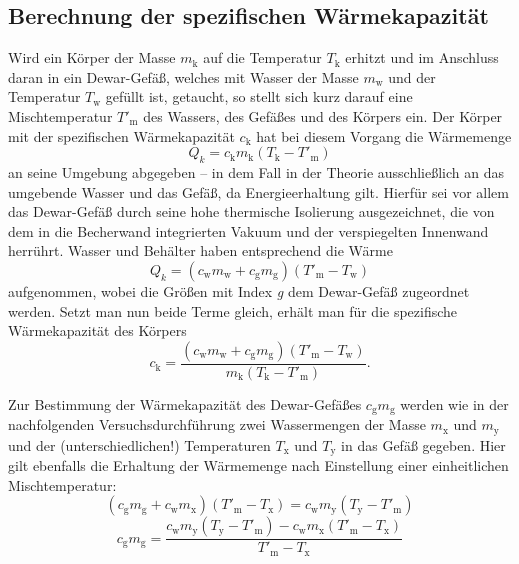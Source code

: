 \subsection{Berechnung der spezifischen Wärmekapazität}
    Wird ein Körper der Masse $m_\text{k}$ auf die Temperatur $T_\text{k}$ erhitzt und im Anschluss daran in ein Dewar-Gefäß, 
    welches mit Wasser der Masse $m_\text{w}$ und der Temperatur $T_\text{w}$ gefüllt ist, getaucht, so stellt sich 
    kurz darauf eine Mischtemperatur $T'_\text{m}$ des Wassers, des Gefäßes und des Körpers ein. 
    Der Körper mit der spezifischen Wärmekapazität $c_\text{k}$ hat bei diesem Vorgang die Wärmemenge 
    \begin{equation}
        Q_k = c_\text{k} m_\text{k} (T_\text{k} - T'_\text{m})
    \end{equation}
    an seine Umgebung abgegeben -- in dem Fall in der Theorie ausschließlich an das umgebende Wasser und das Gefäß, 
    da Energieerhaltung gilt. 
    Hierfür sei vor allem das Dewar-Gefäß durch seine hohe thermische Isolierung ausgezeichnet, die von dem in die 
    Becherwand integrierten Vakuum und der verspiegelten Innenwand herrührt. 
    Wasser und Behälter haben entsprechend die Wärme 
    \begin{equation}
        Q_k = (c_\text{w} m_\text{w} + c_\text{g} m_\text{g}) (T'_\text{m} - T_\text{w})
    \end{equation}
    aufgenommen, wobei die Größen mit Index \textit{g} dem Dewar-Gefäß zugeordnet werden. 
    Setzt man nun beide Terme gleich, erhält man für die spezifische Wärmekapazität des Körpers 
    \begin{equation}
        c_\text{k} = \frac{(c_\text{w} m_\text{w} + c_\text{g}m_\text{g})(T'_\text{m} - T_\text{w})}{m_\text{k}(T_\text{k} - T'_\text{m})}.
        \label{eqn:c_k}
    \end{equation}

    Zur Bestimmung der Wärmekapazität des Dewar-Gefäßes $c_\text{g} m_\text{g}$ werden wie in der nachfolgenden Versuchsdurchführung 
    zwei Wassermengen der Masse $m_\text{x}$ und $m_\text{y}$ und der (unterschiedlichen!) Temperaturen $T_\text{x}$ und 
    $T_\text{y}$ in das Gefäß gegeben. 
    Hier gilt ebenfalls die Erhaltung der Wärmemenge nach Einstellung einer einheitlichen Mischtemperatur: 
    \begin{equation}
        (c_\text{g} m_\text{g} + c_\text{w} m_\text{x})(T'_\text{m} - T_\text{x}) = c_\text{w} m_\text{y} (T_\text{y} - T'_\text{m})
    \end{equation}
    \begin{equation}
        c_\text{g} m_\text{g} = \frac{c_\text{w} m_\text{y} (T_\text{y} - T'_\text{m}) - c_\text{w} m_\text{x} (T'_\text{m} - T_\text{x})}{T'_\text{m} - T_\text{x}}
        \label{eqn:dewar}
    \end{equation}

